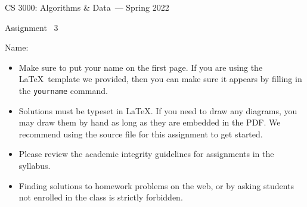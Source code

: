 \documentclass[11pt]{article}
\newcommand{\yourname}{}
\theoremstyle{definition}
\theoremstyle{theorem}
\newcommand{\course}{CS 3000: Algorithms \& Data}
\newcommand{\semester}{Spring 2022}
\newcommand{\psnum}{3}
\begin{document}
{\Large 
\begin{center} \course\ --- \semester\ \end{center}}
{\large
\vspace{10pt}
\noindent Assignment ~\psnum}

\bigskip
{\large
\noindent Name: \yourname \vspace{2pt}\\ 
}
\vspace{15pt}
\begin{itemize}

\item Make sure to put your name on the first page.  If you are using the \LaTeX~template we provided, then you can make sure it appears by filling in the \texttt{yourname} command.

\item Solutions must be typeset in \LaTeX.  If you need to draw any diagrams, you may draw them by hand as long as they are embedded in the PDF.  We recommend using the source file for this assignment to get started.

\item Please review the academic integrity guidelines for assignments in the syllabus.

\item Finding solutions to homework problems on the web, or by asking
  students not enrolled in the class is strictly forbidden.

\end{itemize}
\newpage
\end{document}
